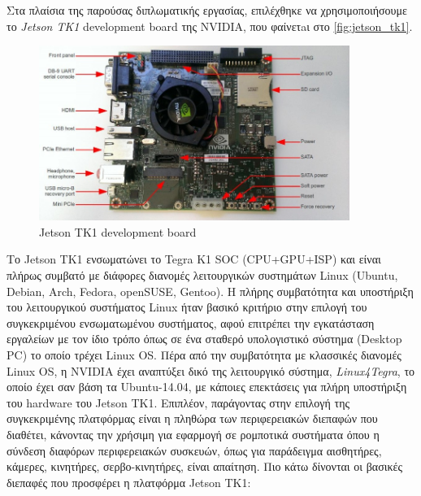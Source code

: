 Στα πλαίσια της παρούσας διπλωματικής εργασίας, επιλέχθηκε να χρησιμοποιήσουμε το
\emph{Jetson TK1} development board της NVIDIA, που φαίνετaι στο \autoref{fig:jetson_tk1}.
\begin{figure}[!ht]
  \centering
  \includegraphics[width=0.9\textwidth]{./images/chapter4/jetson-tk1-labelled.jpg}
  \caption[Jetson TK1 development board]{Jetson TK1 development board}
  \label{fig:jetson_tk1}
\end{figure}
Το Jetson TK1 ενσωματώνει το Tegra K1 SOC (CPU+GPU+ISP)
και είναι πλήρως συμβατό με διάφορες διανομές λειτουργικών συστημάτων Linux (Ubuntu, Debian, Arch, Fedora, openSUSE, Gentoo).
Η πλήρης συμβατότητα και υποστήριξη του λειτουργικού συστήματος Linux ήταν βασικό κριτήριο
στην επιλογή του συγκεκριμένου ενσωματωμένου συστήματος, αφού επιτρέπει την
εγκατάσταση εργαλείων με τον ίδιο τρόπο όπως σε ένα σταθερό υπολογιστικό σύστημα (Desktop PC)
το οποίο τρέχει Linux OS. Πέρα από την συμβατότητα με κλασσικές διανομές Linux OS,
η NVIDIA έχει αναπτύξει δικό της λειτουργικό σύστημα, \emph{Linux4Tegra}, το οποίο
έχει σαν βάση τα Ubuntu-14.04, με κάποιες επεκτάσεις για πλήρη υποστήριξη του hardware του Jetson TK1.
Επιπλέον, παράγοντας στην επιλογή της συγκεκριμένης πλατφόρμας είναι η πληθώρα των περιφερειακών διεπαφών που
διαθέτει, κάνοντας την χρήσιμη για εφαρμογή σε ρομποτικά συστήματα όπου η σύνδεση διαφόρων περιφερειακών συσκευών,
όπως για παράδειγμα αισθητήρες, κάμερες, κινητήρες, σερβο-κινητήρες, είναι απαίτηση.
Πιο κάτω δίνονται οι βασικές διεπαφές που προσφέρει η πλατφόρμα Jetson TK1:
